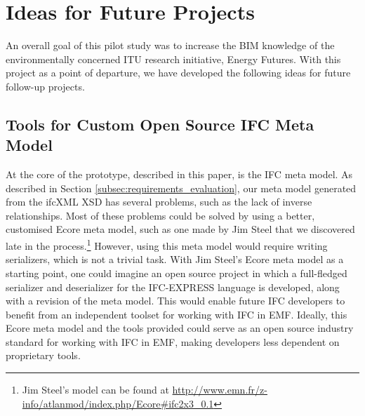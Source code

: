 
\section{Ideas for Future Projects}
\label{sec:plan_for_future_projects}
An overall goal of this pilot study was to increase the BIM knowledge of the environmentally concerned ITU research initiative, Energy Futures. With this project as a point of departure, we have developed the following ideas for future follow-up projects.

\subsection{Tools for Custom Open Source IFC Meta Model}
At the core of the prototype, described in this paper, is the IFC meta model. As described in Section \ref{subsec:requirements_evaluation}, our meta model generated from the ifcXML XSD has several problems, such as the lack of inverse relationships. Most of these problems could be solved by using a better, customised Ecore meta model, such as one made by Jim Steel that we discovered late in the process.\footnote{Jim Steel's model can be found at \url{http://www.emn.fr/z-info/atlanmod/index.php/Ecore#ifc2x3_0.1}} However, using this meta model would require writing serializers, which is not a trivial task. With Jim Steel's Ecore meta model as a starting point, one could imagine an open source project in which a full-fledged serializer and deserializer for the IFC-EXPRESS language is developed, along with a revision of the meta model. This would enable future IFC developers to benefit from an independent toolset for working with IFC in EMF. Ideally, this Ecore meta model and the tools provided could serve as an open source industry standard for working with IFC in EMF, making developers less dependent on proprietary tools.

